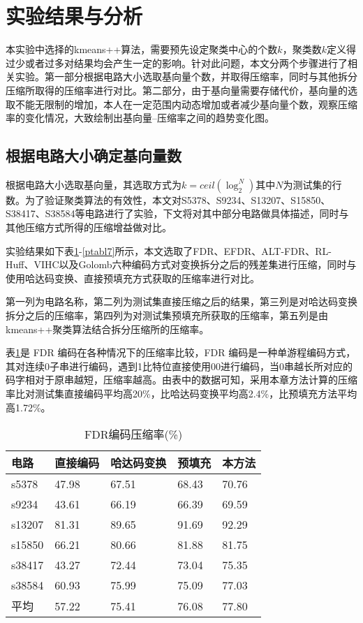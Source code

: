 \section{实验结果与分析}

本实验中选择的kmeans++算法，需要预先设定聚类中心的个数$k$，聚类数$k$定义得过少或者过多对结果均会产生一定的影响。针对此问题，本文分两个步骤进行了相关实验。第一部分根据电路大小选取基向量个数，并取得压缩率，同时与其他拆分压缩所取得的压缩率进行对比。第二部分，由于基向量需要存储代价，基向量的选取不能无限制的增加，本人在一定范围内动态增加或者减少基向量个数，观察压缩率的变化情况，大致绘制出基向量--压缩率之间的趋势变化图。

\subsection{根据电路大小确定基向量数}

根据电路大小选取基向量，其选取方式为$k=ceil(\log_2^N⁡)$其中$N$为测试集的行数。为了验证聚类算法的有效性，本文对S5378、S9234、S13207、S15850、S38417、S38584等电路进行了实验，下文将对其中部分电路做具体描述，同时与其他压缩方式所得的压缩增益做对比。

实验结果如下表\ref{ptabl3}-\ref{ptabl7}所示，本文选取了FDR、EFDR、ALT-FDR、RL-Huff、VIHC以及Golomb六种编码方式对变换拆分之后的残差集进行压缩，同时与使用哈达码变换、直接预填充方式获取的压缩率进行对比。

第一列为电路名称，第二列为测试集直接压缩之后的结果，第三列是对哈达码变换拆分之后的压缩率，第四列为对测试集预填充所获取的压缩率，第五列是由kmeans++聚类算法结合拆分压缩所的压缩率。

表\ref{ptabl3}是 FDR 编码在各种情况下的压缩率比较，FDR 编码是一种单游程编码方式，其对连续0子串进行编码，遇到1比特位直接使用00进行编码，当0串越长所对应的码字相对于原串越短，压缩率越高。由表中的数据可知，采用本章方法计算的压缩率比对测试集直接编码平均高20\%，比哈达码变换平均高2.4\%，比预填充方法平均高1.72\%。

\begin{table}[H]
\centering
\caption{FDR编码压缩率(\%)}\label{ptabl3}
\begin{tabular}{p{2.2cm}p{2.7cm}<{\centering}p{3.3cm}<{\centering}p{2.7cm}<{\centering}p{2.7cm}<{\centering}}
\toprule
\textbf{电路}&	\textbf{直接编码}& \textbf{哈达码变换}& \textbf{预填充}& \textbf{本方法}\\
\midrule
s5378&	47.98&	67.51&	68.43&	70.76\\
s9234&	43.61&	66.19&	66.39&	69.59\\
s13207&	81.31&	89.65&	91.69&	92.29\\
s15850&	66.21&	80.66&	81.88&	81.75\\
s38417&	43.27&	72.44&	73.04&	75.35\\
s38584&	60.93&	75.99&	75.09&	77.03\\
平均&	57.22&	75.41&	76.08&	77.80\\
\bottomrule
\end{tabular}
\end{table}

